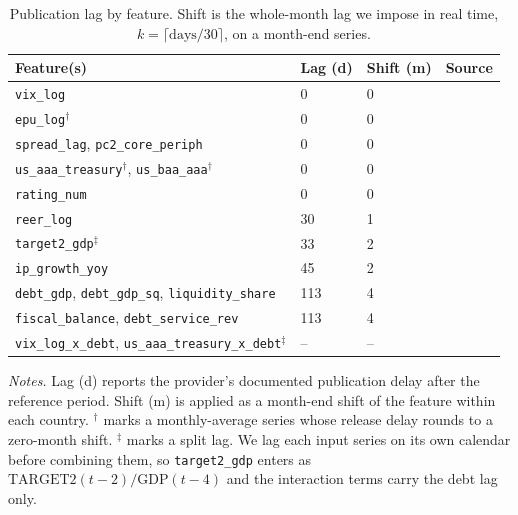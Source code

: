\begin{table}[H]
\centering
\caption{Publication lag by feature. Shift is the whole-month lag we impose in real time, $k=\lceil \text{days}/30\rceil$, on a month-end series.}
\label{tab:publication-lags}
\begin{tabular}{@{}p{4.3cm}p{1.2cm}p{1.4cm}p{5.3cm}@{}}
\toprule
\textbf{Feature(s)} & \textbf{Lag (d)} & \textbf{Shift (m)} & \textbf{Source} \\
\midrule
\texttt{vix\_log}                                   & 0    & 0  & \parencite{fred_vixcls} \\
\texttt{epu\_log}$^{\dagger}$                        & 0    & 0  & \parencite[p.\,6, fn.\,8]{baker2016epu} \\
\texttt{spread\_lag}, \texttt{pc2\_core\_periph}     & 0    & 0  & \parencite{ecb_irs_calendar} \\
\texttt{us\_aaa\_treasury}$^{\dagger}$, \texttt{us\_baa\_aaa}$^{\dagger}$
                                                     & 0    & 0  & \parencite{fed_h15_qa} \\
\texttt{rating\_num}                                 & 0    & 0  & \parencite{spglobal_emea_calendar,afonsofurcerigomes2012} \\
\texttt{reer\_log}                                   & 30   & 1  & \parencite{eurostat_erteff} \\
\texttt{target2\_gdp}$^{\ddagger}$                    & 33   & 2  & \parencite{ecb_target_balances} \\
\texttt{ip\_growth\_yoy}                             & 45   & 2  & \parencite{eurostat_ip_releases} \\
\texttt{debt\_gdp}, \texttt{debt\_gdp\_sq},
\texttt{liquidity\_share}                            & 113  & 4  & \parencite{eurostat_gov10qggdebt} \\
\texttt{fiscal\_balance}, \texttt{debt\_service\_rev}& 113  & 4  & \parencite{eurostat_gov10qggnfa} \\
\texttt{vix\_log\_x\_debt},
\texttt{us\_aaa\_treasury\_x\_debt}$^{\ddagger}$      & --   & -- & \parencite{eurostat_gov10qggdebt} \\
\bottomrule
\end{tabular}
\vspace{4pt}
{\footnotesize
\begin{minipage}{0.98\textwidth}
\textit{Notes.} Lag (d) reports the provider's documented publication delay after the reference period. Shift (m) is applied as a month-end shift of the feature within each country. $^{\dagger}$ marks a monthly-average series whose release delay rounds to a zero-month shift. $^{\ddagger}$ marks a split lag. We lag each input series on its own calendar before combining them, so \texttt{target2\_gdp} enters as $\text{TARGET2}(t{-}2)/\text{GDP}(t{-}4)$ and the interaction terms carry the debt lag only.
\end{minipage}}
\end{table}

